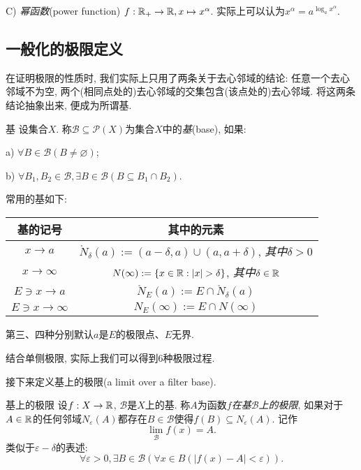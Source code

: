 \vspace{1em}
C) \textit{幂函数}(power function) $f: \mathbb{R} _+ \to \mathbb{R} ,x \mapsto x^{\alpha}$. 实际上可以认为$x^{\alpha} = a^{\log_a{x^{\alpha}}}$. 


\subsection{一般化的极限定义}

在证明极限的性质时, 我们实际上只用了两条关于去心邻域的结论: 任意一个去心邻域不为空, 两个(相同点处的)去心邻域的交集包含(该点处的)去心邻域. 将这两条结论抽象出来, 便成为所谓基.

\begin{definition}{基}
	设集合$X$. 称$\mathcal{B} \subseteq \mathcal{P}(X)$为集合$X$中的\textit{基}(base), 如果: 
	
	a) $\forall B \in \mathcal{B} (B\neq \varnothing)$;
	
	b) $\forall B_1,B_2 \in \mathcal{B} ,\exists B \in \mathcal{B} (B \subseteq B_1 \cap B_2)$. 
\end{definition}

常用的基如下: 

\begin{table}[h]
	\centering
	\renewcommand\arraystretch{1.3}
	\begin{tabular}{cc}
		\toprule
		基的记号           & 其中的元素                    \\
		\midrule
		$x \to a$         & $\mathring{N}_{\delta}(a):=(a-\delta  , a)\cup (a,a+\delta )$, \textit{其中}$\delta >0$      \\
		$x \to \infty$ & $N(\infty) := \{ x\in \R : |x|>\delta \}$, \textit{其中}$\delta \in \mathbb{R}$ \\
		$E \ni x \to a$ & $\mathring{N}_E(a):=E \cap \mathring{N}_{\delta}(a)$          \\
		$E \ni x \to \infty$ & $N_E(\infty) := E \cap N(\infty)$ \\
		\bottomrule
	\end{tabular}
\end{table}

\begin{remark}
	第三、四种分别默认$a$是$E$的极限点、$E$无界. 
\end{remark}

结合单侧极限, 实际上我们可以得到6种极限过程. 

接下来定义基上的极限(a limit over a filter base). 

\begin{definition}{基上的极限}
	设$f:X \to \mathbb{R}$, $\mathcal{B}$是$X$上的基. 称$A$为函数$f$\textit{在基$\mathcal{B}$上的极限}, 如果对于$A \in \mathbb{R}$的任何邻域$N_{\varepsilon}(A)$都存在$B \in \mathcal{B}$使得$f(B) \subseteq N_{\varepsilon}(A)$. 记作$$\lim_{\mathcal{B}}f(x)=A.$$
	类似于$\varepsilon - \delta$的表述: $$\forall \varepsilon > 0, \exists B \in \mathcal{B}(\forall x \in B (|f(x)-A|<\varepsilon)).$$
\end{definition}

